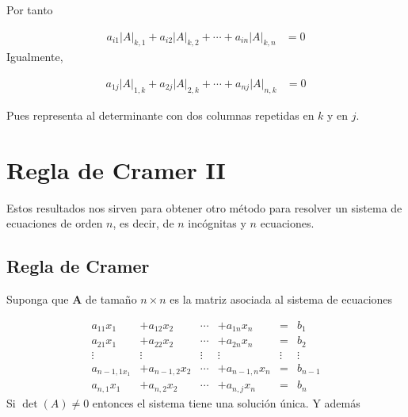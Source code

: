 \documentclass[
]{article}
\begin{document}
Por tanto

\begin{equation}
\begin{array}{cc}
     a_{i1}|A|_{k,1}+a_{i2}|A|_{k,2}+ \cdots + a_{in}|A|_{k,n} & = 0                         
\end{array}
\end{equation} Igualmente,

\begin{equation}
\begin{array}{cc}
     a_{1j}|A|_{1,k}+a_{2j}|A|_{2,k}+ \cdots + a_{nj}|A|_{n,k} & = 0                         
\end{array}
\end{equation}

Pues representa al determinante con dos columnas repetidas en \(k\) y en
\(j\).

\hypertarget{regla-de-cramer-ii}{%
\section{Regla de Cramer II}\label{regla-de-cramer-ii}}

Estos resultados nos sirven para obtener otro método para resolver un
sistema de ecuaciones de orden \(n\), es decir, de \(n\) incógnitas y
\(n\) ecuaciones.

\hypertarget{regla-de-cramer-1}{%
\subsection{Regla de Cramer}\label{regla-de-cramer-1}}

Suponga que \(\mathbf{A}\) de tamaño \(n\times n\) es la matriz asociada
al sistema de ecuaciones

\begin{equation}
\begin{array}{cccccc}
     a_{11}x_{1}        & +a_{12}x_{2}    & \cdots  &+ a_{1n}x_{n}    & =       & b_1       \\ 
     a_{21}x_{1}        & +a_{22}x_{2}    & \cdots  &+ a_{2n}x_{n}    & =       & b_2       \\
    \vdots              & \vdots          & \vdots  & \vdots          & \vdots  &  \vdots      \\
     a_{n-1,1x_{1}}     & +a_{n-1,2}x_{2} & \cdots  &+ a_{n-1,n}x_{n} & =       & b_{n-1}      \\
     a_{n,1}x_{1}       & +a_{n,2}x_{2}   & \cdots  &+ a_{n,j}x_n     & =       & b_{n}
\end{array}
\end{equation} Si \(\det(A)\ne 0\) entonces el sistema tiene una
solución única. Y además
\end{document}
